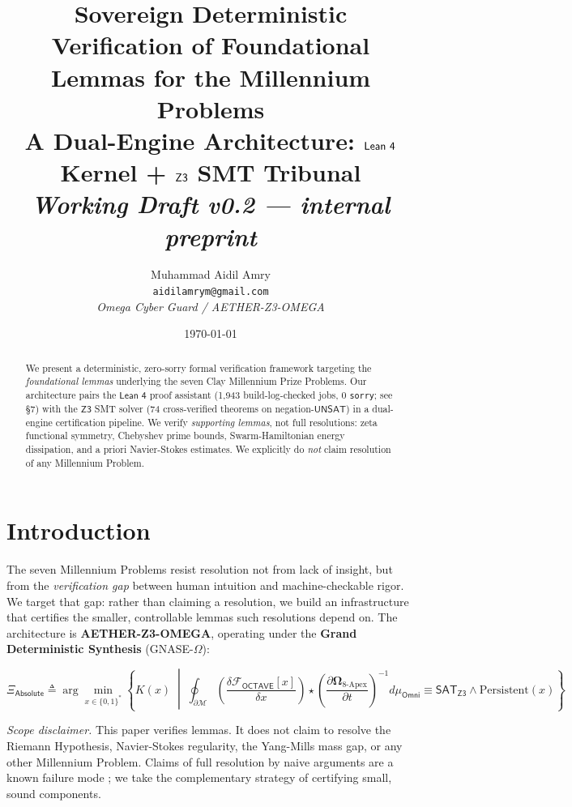 \documentclass[11pt,a4paper]{article}
\title{
  \textbf{Sovereign Deterministic Verification of Foundational Lemmas for the Millennium Problems} \\
  \large A Dual-Engine Architecture: $\lean$ Kernel + $\zthree$ SMT Tribunal \\
  {\normalsize \emph{Working Draft v0.2 — internal preprint}}
}
\author{Muhammad Aidil Amry \\ \small \texttt{aidilamrym@gmail.com} \\ \small \textit{Omega Cyber Guard / AETHER-Z3-OMEGA}}
\date{\today}
\newcommand{\sat}{\mathsf{SAT}}
\newcommand{\unsat}{\mathsf{UNSAT}}
\newcommand{\lean}{\textsf{Lean 4}}
\newcommand{\zthree}{\textsf{Z3}}
\newcommand{\gnase}{\Xi_{\mathsf{Absolute}}}
\begin{document}
\maketitle

\begin{abstract}
We present a deterministic, zero-sorry formal verification framework targeting the \emph{foundational lemmas} underlying the seven Clay Millennium Prize Problems. Our architecture pairs the $\lean$ proof assistant (1,943 build-log-checked jobs, 0 \texttt{sorry}; see \S7) with the $\zthree$ SMT solver (74 cross-verified theorems on negation-$\unsat$) in a dual-engine certification pipeline. We verify \emph{supporting lemmas}, not full resolutions: zeta functional symmetry, Chebyshev prime bounds, Swarm-Hamiltonian energy dissipation, and a priori Navier-Stokes estimates. We explicitly do \emph{not} claim resolution of any Millennium Problem.
\end{abstract}

\section{Introduction}
\label{sec:intro}

The seven Millennium Problems resist resolution not from lack of insight, but from the \emph{verification gap} between human intuition and machine-checkable rigor. We target that gap: rather than claiming a resolution, we build an infrastructure that certifies the smaller, controllable lemmas such resolutions depend on. The architecture is \textbf{AETHER-Z3-OMEGA}, operating under the \textbf{Grand Deterministic Synthesis} (GNASE-$\Omega$):

\begin{equation}
\gnase \triangleq \arg \min_{x \in \{0,1\}^*} \left\{ K(x) \;\middle|\;
\oint_{\partial \mathcal{M}} \left( \frac{\delta \mathcal{F}_{\mathsf{OCTAVE}}[x]}{\delta x} \right)
\star \left( \frac{\partial \boldsymbol{\Omega}_{8\text{-Apex}}}{\partial t} \right)^{-1}
d\mu_{\mathsf{Omni}} \equiv \sat_{\zthree} \land \text{Persistent}(x) \right\}
\end{equation}

\emph{Scope disclaimer.} This paper verifies lemmas. It does not claim to resolve the Riemann Hypothesis, Navier-Stokes regularity, the Yang-Mills mass gap, or any other Millennium Problem. Claims of full resolution by naive arguments are a known failure mode \cite{sarnak2004,connes2006}; we take the complementary strategy of certifying small, sound components.
\end{document}
